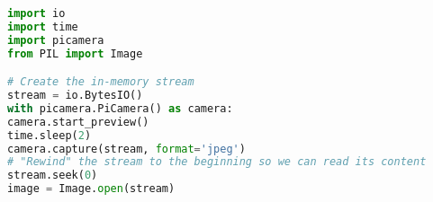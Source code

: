 \begin{lstlisting}[language=Python,caption={Bild aufnehmen mit der Raspberry Pi Camera},label=lst:picamera]
import io
import time
import picamera
from PIL import Image

# Create the in-memory stream
stream = io.BytesIO()
with picamera.PiCamera() as camera:
camera.start_preview()
time.sleep(2)
camera.capture(stream, format='jpeg')
# "Rewind" the stream to the beginning so we can read its content
stream.seek(0)
image = Image.open(stream)
\end{lstlisting}
